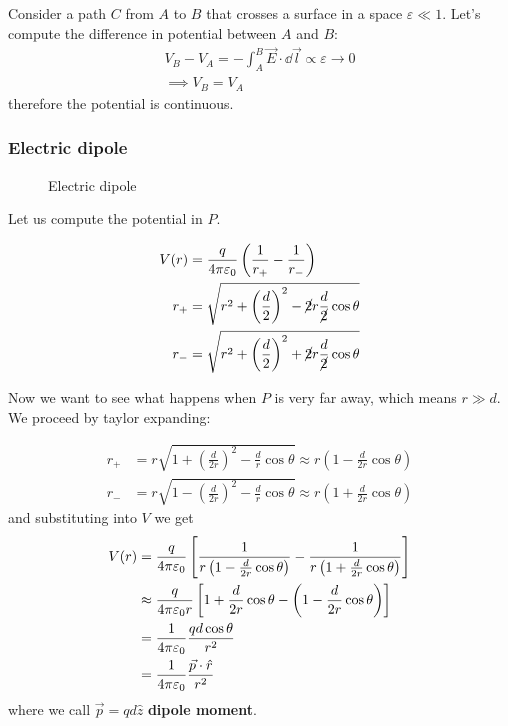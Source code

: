 \documentclass[12pt]{extarticle}
\begin{document}
Consider a path $C$ from $A$ to $B$ that crosses a surface in a space $\varepsilon \ll 1$. Let's compute the difference in potential between $A$ and $B$:
\begin{gather}
    V_B - V_A = - \int_A^B \vec E \cdot \dd{\vec l} \propto \varepsilon \to 0 \\
    \implies V_B = V_A
\end{gather}
therefore the potential is continuous.

\subsubsection{Electric dipole}

\begin{figure}[H]
    \centering
    
    \caption{Electric dipole}
    \label{fig:electric-dipole}
\end{figure}

Let us compute the potential in $P$.

\begin{align}
    V(r) & = \frac{q}{4 \pi \varepsilon_0} \left( \frac{1}{r_+} - \frac{1}{r_-} \right)                 \\
    r_+  & = \sqrt{r^2 + \left( \frac{d}{2} \right)^2 - \cancel {2} r \frac{d}{\cancel{2}} \cos \theta} \\
    r_-  & = \sqrt{r^2 + \left( \frac{d}{2} \right)^2 + \cancel {2} r \frac{d}{\cancel{2}} \cos \theta} \\
\end{align}

Now we want to see what happens when $P$ is very far away, which means $r \gg d$.
We proceed by taylor expanding:

\begin{align}
    r_+ & = r \sqrt{1 + \left( \frac{d}{2r} \right)^2 - \frac{d}{r} \cos \theta} \approx r \left( 1- \frac{d}{2r} \cos \theta \right)  \\
    r_- & = r \sqrt{1 - \left( \frac{d}{2r} \right)^2 - \frac{d}{r} \cos \theta} \approx r \left( 1 + \frac{d}{2r} \cos \theta \right)
\end{align}
and substituting into $V$ we get
\begin{align}
    V(r) & = \frac{q}{4 \pi \varepsilon_0} \left[ \frac{1}{r \left( 1- \frac{d}{2r} \cos \theta \right)} - \frac{1}{r \left( 1 + \frac{d}{2r} \cos \theta \right)} \right] \\
         & \approx  \frac{q}{4 \pi \varepsilon_0 r} \left[ 1 + \frac{d}{2r}\cos\theta - \left( 1- \frac{d}{2r} \cos \theta \right) \right]                                 \\
         & = \frac{1}{4 \pi \varepsilon_0} \frac{q d \cos \theta}{r^2}                                                                                                     \\
         & = \frac{1}{4 \pi \varepsilon_0} \frac{\vec p \cdot \hat r}{r^2}
\end{align}
where we call $\vec p = q d \hat z$ \textbf{dipole moment}.
\end{document}
